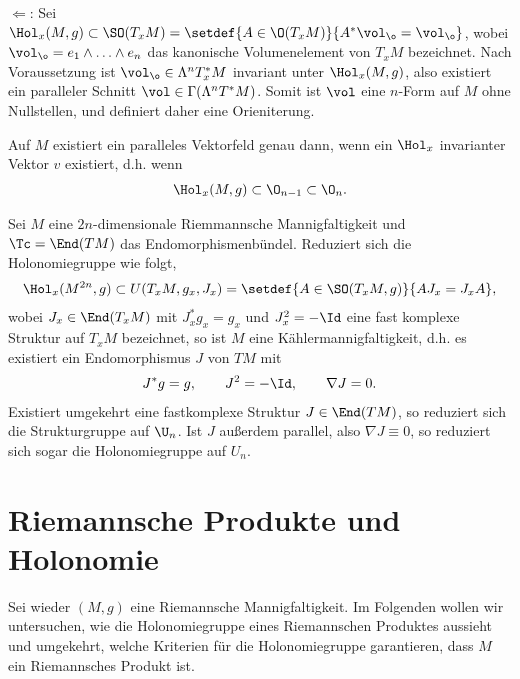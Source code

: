 \documentclass[%
	paper=a5,%
	fleqn,%
	DIV=18,%
	BCOR=0mm,
	fontsize=11pt,
	titlepage=false,%
	bibliography=totoc,
	DIV=18,%
	twoside=true,
	pdftitle=Riemannsche Geometrie,
	pdfauthor=Uwe Semmelmann,
	numbers=noendperiod]%
	{scrbook}
\begin{document}
\begin{ex}
\begin{exenum}
$\Leftarrow$: Sei $\Hol_{x}(M,g) \subset \SO(T_{x}M) = \setdef{A \in \O(T_{x}M)}{A^*\vol_{\o} = \vol_{\o}}$, wobei $\vol_{\o} = e_{1}\wedge \ldots \wedge e_{n}$ das kanonische Volumenelement von $T_{x}M$ bezeichnet. Nach Voraussetzung ist $\vol_{\o}\in \Lambda^n T_{x}^*M$ invariant unter $\Hol_{x}(M,g)$, also existiert ein paralleler Schnitt $\vol \in \Gamma(\Lambda^n T^*M)$. Somit ist $\vol$ eine $n$-Form auf $M$ ohne Nullstellen, und definiert daher eine Orieniterung.
\item Auf $M$ existiert ein paralleles Vektorfeld genau dann, wenn ein $\Hol_{x}$ invarianter Vektor $v$ existiert, d.h. wenn
\begin{align*}
\Hol_{x}(M,g) \subset \O_{n-1}\subset \O_{n}.
\end{align*}
\item Sei $M$ eine $2n$-dimensionale Riemmannsche Mannigfaltigkeit und $\Tc = \End(TM)$ das Endomorphismenbündel. Reduziert sich die Holonomiegruppe wie folgt,
\begin{align*}
\Hol_{x}(M^{2n},g) \subset U(T_{x}M,g_{x},J_{x}) = \setdef{A\in \SO(T_{x}M,g)}{AJ_{x} = J_{x}A},
\end{align*}
wobei $J_{x}\in \End(T_{x}M)$ mit $J_{x}^*g_{x} = g_{x}$ und $J_{x}^2 = -\Id$ eine fast komplexe Struktur auf $T_{x}M$ bezeichnet, so ist $M$ eine Kählermannigfaltigkeit, d.h. es existiert ein Endomorphismus $J$ von $TM$ mit
\begin{align*}
J^*g = g,\qquad J^2 = -\Id,\qquad \nabla J = 0.
\end{align*}
Existiert umgekehrt eine fastkomplexe Struktur $J\in \End(TM)$, so reduziert sich die Strukturgruppe auf $\U_{n}$. Ist $J$ außerdem parallel, also $\nabla J \equiv 0$, so reduziert sich sogar die Holonomiegruppe auf $U_{n}$.\boxc
\end{exenum}
\end{ex}

\section{Riemannsche Produkte und Holonomie}

Sei wieder $(M,g)$ eine Riemannsche Mannigfaltigkeit. Im Folgenden wollen wir untersuchen, wie die Holonomiegruppe eines Riemannschen Produktes aussieht und umgekehrt, welche Kriterien für die Holonomiegruppe garantieren, dass $M$ ein Riemannsches Produkt ist.
\end{document}
